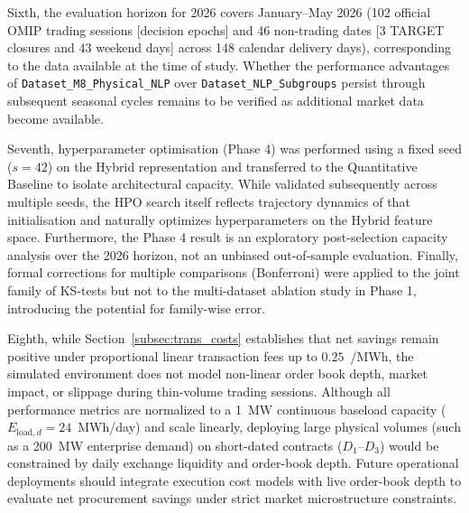 Sixth, the evaluation horizon for 2026 covers January--May 2026 (102 official OMIP trading sessions [decision epochs] and 46 non-trading dates [3 TARGET closures and 43 weekend days] across 148 calendar delivery days), corresponding to the data available at the time of study. Whether the performance advantages of \texttt{Dataset\_\allowbreak M8\_\allowbreak Physical\_\allowbreak NLP} over \texttt{Dataset\_\allowbreak NLP\_\allowbreak Subgroups} persist through subsequent seasonal cycles remains to be verified as additional market data become available.

Seventh, hyperparameter optimisation (Phase 4) was performed using a fixed seed ($s=42$) on the Hybrid representation and transferred to the Quantitative Baseline to isolate architectural capacity. While validated subsequently across multiple seeds, the HPO search itself reflects trajectory dynamics of that initialisation and naturally optimizes hyperparameters on the Hybrid feature space. Furthermore, the Phase 4 result is an exploratory post-selection capacity analysis over the 2026 horizon, not an unbiased out-of-sample evaluation. Finally, formal corrections for multiple comparisons (Bonferroni) were applied to the joint family of KS-tests but not to the multi-dataset ablation study in Phase 1, introducing the potential for family-wise error.

Eighth, while Section~\ref{subsec:trans_costs} establishes that net savings remain positive under proportional linear transaction fees up to $0.25$~\texteuro/MWh, the simulated environment does not model non-linear order book depth, market impact, or slippage during thin-volume trading sessions. Although all performance metrics are normalized to a 1~MW continuous baseload capacity ($E_{\text{load}, d} = 24$~MWh/day) and scale linearly, deploying large physical volumes (such as a 200~MW enterprise demand) on short-dated contracts ($D_1$--$D_3$) would be constrained by daily exchange liquidity and order-book depth. Future operational deployments should integrate execution cost models with live order-book depth to evaluate net procurement savings under strict market microstructure constraints.


